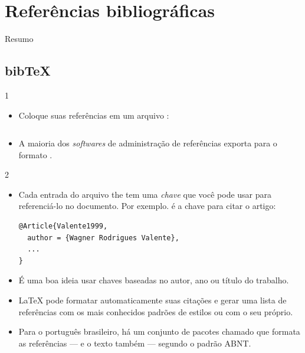 \documentclass{beamer}
\begin{document}
\section{Referências bibliográficas}

\begin{frame}{Resumo}
\begin{multicols}{2}
\tableofcontents[currentsection]
\end{multicols}
\end{frame}
 
\subsection{bib\TeX}
\begin{frame}[fragile]{\insertsubsection{} 1} 
\begin{itemize}
\item Coloque suas referências em um arquivo  :
\inputminted[fontsize=\tiny,frame=single]{latex}{bib-example.bib}
\item A maioria dos \emph{softwares} de administração de referências exporta para o formato .
\end{itemize}
\end{frame}

\begin{frame}[fragile]{\insertsubsection{} 2}
\begin{itemize}
\item Cada entrada do arquivo the  tem uma \emph{chave} que você pode
usar para referenciá-lo no documento. Por exemplo.   é
a chave para citar o artigo:
\begin{verbatim}
@Article{Valente1999,
  author = {Wagner Rodrigues Valente},
  ...
}
\end{verbatim} 
\item É uma boa ideia usar chaves baseadas no autor, ano ou título do trabalho.
\item \LaTeX{} pode formatar automaticamente suas citações e gerar uma lista de
referências com os mais conhecidos padrões de estilos ou com o seu próprio.
\item Para o português brasileiro, há um conjunto de pacotes chamado 
\href{http://www.abntex.net.br/}{} que
formata as referências --- e o texto também --- segundo o padrão ABNT. 
\end{itemize}
\end{frame}
\end{document}
